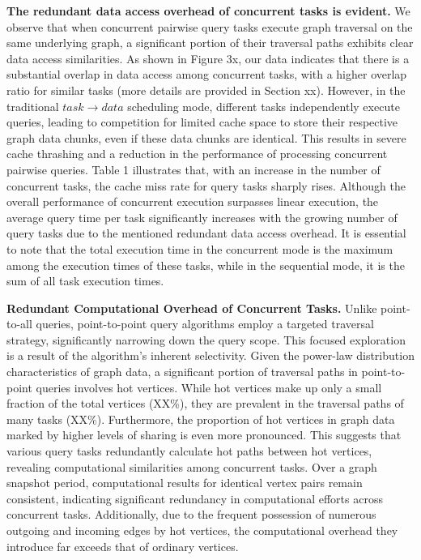 \documentclass[lettersize,journal]{IEEEtran} %
\begin{document}
{\bf{The redundant data access overhead of concurrent tasks is evident.}} We observe that when concurrent pairwise query tasks execute graph traversal on the same underlying graph, a significant portion of their traversal paths exhibits clear data access similarities. As shown in Figure 3x, our data indicates that there is a substantial overlap in data access among concurrent tasks, with a higher overlap ratio for similar tasks (more details are provided in Section xx). However, in the traditional $task \rightarrow data$ scheduling mode, different tasks independently execute queries, leading to competition for limited cache space to store their respective graph data chunks, even if these data chunks are identical. This results in severe cache thrashing and a reduction in the performance of processing concurrent pairwise queries. Table 1 illustrates that, with an increase in the number of concurrent tasks, the cache miss rate for query tasks sharply rises. Although the overall performance of concurrent execution surpasses linear execution, the average query time per task significantly increases with the growing number of query tasks due to the mentioned redundant data access overhead. It is essential to note that the total execution time in the concurrent mode is the maximum among the execution times of these tasks, while in the sequential mode, it is the sum of all task execution times.


{\bf{Redundant Computational Overhead of Concurrent Tasks.}} Unlike point-to-all queries, point-to-point query algorithms employ a targeted traversal strategy, significantly narrowing down the query scope. This focused exploration is a result of the algorithm's inherent selectivity. Given the power-law distribution characteristics of graph data, a significant portion of traversal paths in point-to-point queries involves hot vertices. While hot vertices make up only a small fraction of the total vertices (XX\%), they are prevalent in the traversal paths of many tasks (XX\%). Furthermore, the proportion of hot vertices in graph data marked by higher levels of sharing is even more pronounced. This suggests that various query tasks redundantly calculate hot paths between hot vertices, revealing computational similarities among concurrent tasks. Over a graph snapshot period, computational results for identical vertex pairs remain consistent, indicating significant redundancy in computational efforts across concurrent tasks. Additionally, due to the frequent possession of numerous outgoing and incoming edges by hot vertices, the computational overhead they introduce far exceeds that of ordinary vertices.
\end{document}
